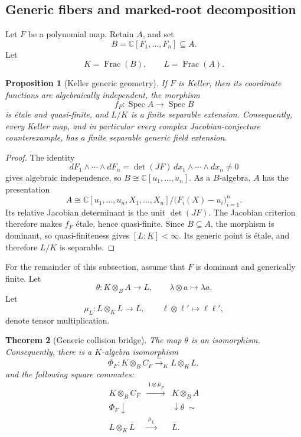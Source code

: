 \documentclass[11pt]{article}
\newtheorem{theorem}{Theorem}[section]
\newtheorem{proposition}[theorem]{Proposition}
\theoremstyle{remark}
\DeclareMathOperator{\Spec}{Spec}
\DeclareMathOperator{\Frac}{Frac}
\newcommand{\C}{\mathbb C}
\begin{document}
\subsection{Generic fibers and marked-root decomposition}
\label{sec:generic-galois-bridge}

Let \(F\) be a polynomial map.  Retain \(A\), and set
\[
  B=\C[F_1,\dots,F_n]\subseteq A.
\]
Let
\[
  K=\Frac(B),
  \qquad
  L=\Frac(A).
\]

\begin{proposition}[Keller generic geometry]
\label{prop:keller-generic-geometry}
If \(F\) is Keller, then its coordinate functions are algebraically
independent, the morphism
\[
  f_F\colon\Spec A\longrightarrow\Spec B
\]
is \'etale and quasi-finite, and \(L/K\) is a finite separable extension.
Consequently, every Keller map, and in particular every complex
Jacobian-conjecture counterexample, has a finite separable generic field
extension.
\end{proposition}

\begin{proof}
The identity
\[
  dF_1\wedge\cdots\wedge dF_n
  =\det(JF)\,dx_1\wedge\cdots\wedge dx_n\neq0
\]
gives algebraic independence, so
\(B\cong\C[u_1,\dots,u_n]\).  As a \(B\)-algebra, \(A\) has the
presentation
\[
  A\cong
  \C[u_1,\dots,u_n,X_1,\dots,X_n]
  \big/\bigl(F_i(X)-u_i\bigr)_{i=1}^n.
\]
Its relative Jacobian determinant is the unit \(\det(JF)\).  The Jacobian
criterion therefore makes \(f_F\) \'etale, hence quasi-finite.  Since
\(B\subseteq A\), the morphism is dominant, so quasi-finiteness gives
\([L:K]<\infty\).  Its generic point is \'etale, and therefore \(L/K\) is
separable.
\end{proof}

For the remainder of this subsection, assume that \(F\) is dominant and
generically finite.  Let
\[
  \theta\colon K\otimes_BA\longrightarrow L,
  \qquad
  \lambda\otimes a\longmapsto\lambda a.
\]
Let
\[
  \mu_L\colon L\otimes_KL\longrightarrow L,
  \qquad
  \ell\otimes\ell'\longmapsto\ell\ell',
\]
denote tensor multiplication.

\begin{theorem}[Generic collision bridge]
\label{thm:generic-collision-base-change}
The map \(\theta\) is an isomorphism.  Consequently, there is a
\(K\)-algebra isomorphism
\[
  \Phi_F\colon K\otimes_BC_F
  \xrightarrow{\sim}_K
  L\otimes_KL,
\]
and the following square commutes:
\[
  \begin{array}{ccc}
    K\otimes_BC_F
      &\xrightarrow{\ 1\otimes\bar\mu_F\ }&
    K\otimes_BA\\
    {\scriptstyle\Phi_F}\downarrow
      &&\downarrow{\scriptstyle\theta\ \sim}\\
    L\otimes_KL
      &\xrightarrow{\ \mu_L\ }&
    L.
  \end{array}
\]
\end{theorem}
\end{document}
